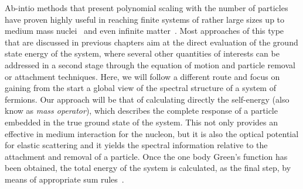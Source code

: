 Ab-intio methods that present polynomial scaling with the number of particles have proven highly useful in reaching
finite systems of rather large sizes up to medium mass nuclei~\cite{ch11_Soma2014s2n,ch11_Barbieri2014qmbt17,ch11_CCM_2014rev} %
and even infinite matter~\cite{ch11_Frick2003,ch11_Baardsen2013ccNM,ch11_Carbone2014}. Most approaches of this type that are discussed in previous chapters aim at the direct evaluation of the ground state energy of the system, where several other quantities of interests can be addressed in a second stage through the equation of motion and particle removal or attachment techniques.
%
Here, we will follow a different route and focus on gaining from the start a global  view of the spectral structure of a system of fermions. Our approach will be that of calculating directly the self-energy (also know as {\em mass operator}), which describes the 
complete response of a particle embedded in the true ground state of the system. This not only provides an effective in medium interaction for the nucleon, but it is also the optical potential for elastic scattering and it yields the spectral information relative to the attachment and removal of a particle.   Once the  one body Green's function has been obtained, the total energy of the system is calculated, as the final step, by means of appropriate sum rules~\cite{ch11_Koltun1974KSR,ch11_dickhoff2004}.

